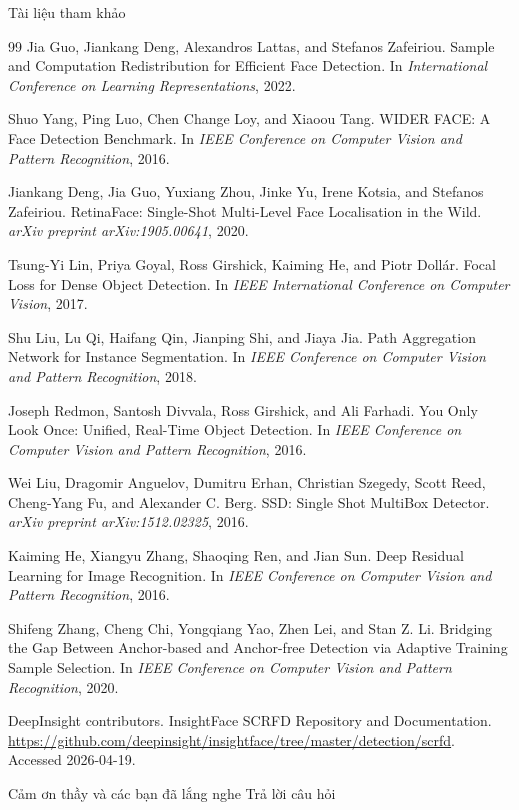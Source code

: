 \documentclass[aspectratio=169,11pt]{beamer}
\begin{document}
\begin{frame}[allowframebreaks]{Tài liệu tham khảo}
\footnotesize
\begin{thebibliography}{99}
Jia Guo, Jiankang Deng, Alexandros Lattas, and Stefanos Zafeiriou.
\newblock Sample and Computation Redistribution for Efficient Face Detection.
\newblock In \emph{International Conference on Learning Representations}, 2022.

Shuo Yang, Ping Luo, Chen Change Loy, and Xiaoou Tang.
\newblock WIDER FACE: A Face Detection Benchmark.
\newblock In \emph{IEEE Conference on Computer Vision and Pattern Recognition}, 2016.

Jiankang Deng, Jia Guo, Yuxiang Zhou, Jinke Yu, Irene Kotsia, and Stefanos Zafeiriou.
\newblock RetinaFace: Single-Shot Multi-Level Face Localisation in the Wild.
\newblock \emph{arXiv preprint arXiv:1905.00641}, 2020.

Tsung-Yi Lin, Priya Goyal, Ross Girshick, Kaiming He, and Piotr Dollár.
\newblock Focal Loss for Dense Object Detection.
\newblock In \emph{IEEE International Conference on Computer Vision}, 2017.

Shu Liu, Lu Qi, Haifang Qin, Jianping Shi, and Jiaya Jia.
\newblock Path Aggregation Network for Instance Segmentation.
\newblock In \emph{IEEE Conference on Computer Vision and Pattern Recognition}, 2018.

Joseph Redmon, Santosh Divvala, Ross Girshick, and Ali Farhadi.
\newblock You Only Look Once: Unified, Real-Time Object Detection.
\newblock In \emph{IEEE Conference on Computer Vision and Pattern Recognition}, 2016.

Wei Liu, Dragomir Anguelov, Dumitru Erhan, Christian Szegedy, Scott Reed, Cheng-Yang Fu, and Alexander C. Berg.
\newblock SSD: Single Shot MultiBox Detector.
\newblock \emph{arXiv preprint arXiv:1512.02325}, 2016.

Kaiming He, Xiangyu Zhang, Shaoqing Ren, and Jian Sun.
\newblock Deep Residual Learning for Image Recognition.
\newblock In \emph{IEEE Conference on Computer Vision and Pattern Recognition}, 2016.

Shifeng Zhang, Cheng Chi, Yongqiang Yao, Zhen Lei, and Stan Z. Li.
\newblock Bridging the Gap Between Anchor-based and Anchor-free Detection via Adaptive Training Sample Selection.
\newblock In \emph{IEEE Conference on Computer Vision and Pattern Recognition}, 2020.

DeepInsight contributors.
\newblock InsightFace SCRFD Repository and Documentation.
\newblock \url{https://github.com/deepinsight/insightface/tree/master/detection/scrfd}. Accessed 2026-04-19.
\end{thebibliography}
\end{frame}

\begin{frame}{Cảm ơn thầy và các bạn đã lắng nghe}
  \centering
  {\Large Trả lời câu hỏi}
\end{frame}
\end{document}
